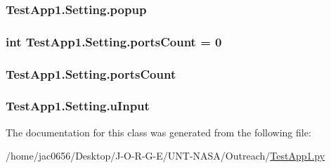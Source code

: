 \subsubsection[{\texorpdfstring{popup}{popup}}]{\setlength{\rightskip}{0pt plus 5cm}Test\+App1.\+Setting.\+popup}\hypertarget{classTestApp1_1_1Setting_a81e1c9b44e01ada3511d867f4e82dd1b}{}\label{classTestApp1_1_1Setting_a81e1c9b44e01ada3511d867f4e82dd1b}
\subsubsection[{\texorpdfstring{ports\+Count}{portsCount}}]{\setlength{\rightskip}{0pt plus 5cm}int Test\+App1.\+Setting.\+ports\+Count = 0\hspace{0.3cm}{\ttfamily [static]}}\hypertarget{classTestApp1_1_1Setting_ac239309579e700d31ce489ed32557200}{}\label{classTestApp1_1_1Setting_ac239309579e700d31ce489ed32557200}
\subsubsection[{\texorpdfstring{ports\+Count}{portsCount}}]{\setlength{\rightskip}{0pt plus 5cm}Test\+App1.\+Setting.\+ports\+Count}\hypertarget{classTestApp1_1_1Setting_a2136b22973822bf1b2881f357439d362}{}\label{classTestApp1_1_1Setting_a2136b22973822bf1b2881f357439d362}
\subsubsection[{\texorpdfstring{u\+Input}{uInput}}]{\setlength{\rightskip}{0pt plus 5cm}Test\+App1.\+Setting.\+u\+Input}\hypertarget{classTestApp1_1_1Setting_afc9d6674bdc5d0684fee6149b9c0f419}{}\label{classTestApp1_1_1Setting_afc9d6674bdc5d0684fee6149b9c0f419}


The documentation for this class was generated from the following file\+:\begin{DoxyCompactItemize}
\item 
/home/jac0656/\+Desktop/\+J-\/\+O-\/\+R-\/\+G-\/\+E/\+U\+N\+T-\/\+N\+A\+S\+A/\+Outreach/\hyperlink{Outreach_2TestApp1_8py}{Test\+App1.\+py}\end{DoxyCompactItemize}
